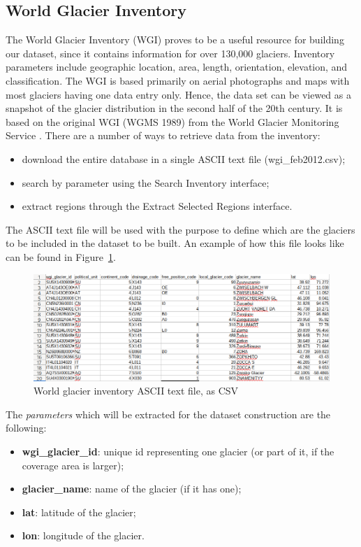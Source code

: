 \documentclass[11pt, a4paper]{report}
\begin{document}
	\subsection{World Glacier Inventory}
	\label{seq:wgi}
	The World Glacier Inventory (WGI) proves to be a useful resource for building our dataset, since it contains information for over 130,000 glaciers. Inventory parameters include geographic location, area, length, orientation, elevation, and classification. The WGI is based primarily on aerial photographs and maps with most glaciers having one data entry only. Hence, the data set can be viewed as a snapshot of the glacier distribution in the second half of the 20th century. It is based on the original WGI (WGMS 1989) from the World Glacier Monitoring Service \cite{WGI}.  
	There are a number of ways to retrieve data from the inventory:
	\begin{itemize}
		\item download the entire database in a single ASCII text file (wgi\_feb2012.csv);
		\item search by parameter using the Search Inventory interface;
		\item extract regions through the Extract Selected Regions interface.
	\end{itemize}

	The ASCII text file will be used with the purpose to define which are the glaciers to be included in the dataset to be built. An example of how this file looks like can be found in Figure~\ref{fig:WGI_ASCII}.
	
	\begin{figure}[h]
		\centering
		\includegraphics[scale=0.5]{../images/wgi_ASCII_file.png}
		\caption{World glacier inventory ASCII text file, as CSV}
		\label{fig:WGI_ASCII}
	\end{figure}
	
	The \emph{parameters} which will be extracted for the dataset construction are the following:
	\begin{itemize}
		\item \textbf{wgi\_glacier\_id}: unique id representing one glacier (or part of it, if the coverage area is larger);
		\item \textbf{glacier\_name}: name of the glacier (if it has one);
		\item \textbf{lat}: latitude of the glacier;
		\item \textbf{lon}: longitude of the glacier.
	\end{itemize}
\end{document}
